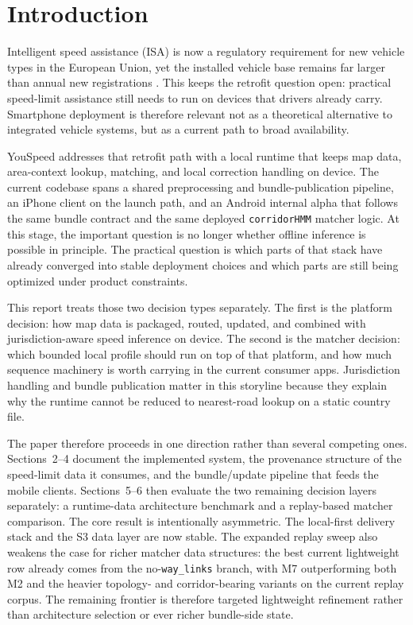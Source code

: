 \documentclass{article}
\begin{document}

\section{Introduction}
Intelligent speed assistance (ISA) is now a regulatory requirement for new vehicle types in the European Union, yet the installed vehicle base remains far larger than annual new registrations \cite{eu2019_2144,eu2021_1958,eu_mandatory_safety_2024,eurostat_passenger_cars_2026,acea_registrations_2024}. This keeps the retrofit question open: practical speed-limit assistance still needs to run on devices that drivers already carry. Smartphone deployment is therefore relevant not as a theoretical alternative to integrated vehicle systems, but as a current path to broad availability.

YouSpeed addresses that retrofit path with a local runtime that keeps map data, area-context lookup, matching, and local correction handling on device. The current codebase spans a shared preprocessing and bundle-publication pipeline, an iPhone client on the launch path, and an Android internal alpha that follows the same bundle contract and the same deployed \texttt{corridorHMM} matcher logic. At this stage, the important question is no longer whether offline inference is possible in principle. The practical question is which parts of that stack have already converged into stable deployment choices and which parts are still being optimized under product constraints.

This report treats those two decision types separately. The first is the platform decision: how map data is packaged, routed, updated, and combined with jurisdiction-aware speed inference on device. The second is the matcher decision: which bounded local profile should run on top of that platform, and how much sequence machinery is worth carrying in the current consumer apps. Jurisdiction handling and bundle publication matter in this storyline because they explain why the runtime cannot be reduced to nearest-road lookup on a static country file.

The paper therefore proceeds in one direction rather than several competing ones. Sections~2--4 document the implemented system, the provenance structure of the speed-limit data it consumes, and the bundle/update pipeline that feeds the mobile clients. Sections~5--6 then evaluate the two remaining decision layers separately: a runtime-data architecture benchmark and a replay-based matcher comparison. The core result is intentionally asymmetric. The local-first delivery stack and the S3 data layer are now stable. The expanded replay sweep also weakens the case for richer matcher data structures: the best current lightweight row already comes from the no-\texttt{way\_links} branch, with M7 outperforming both M2 and the heavier topology- and corridor-bearing variants on the current replay corpus. The remaining frontier is therefore targeted lightweight refinement rather than architecture selection or ever richer bundle-side state.
\end{document}
